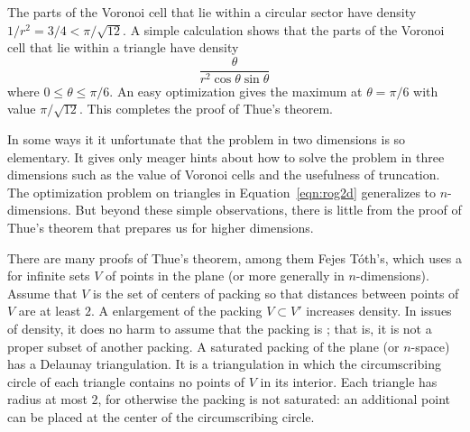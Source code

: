 The parts of the Voronoi cell that lie within a circular sector have
density $1/r^2 = 3/4 < \pi/\sqrt{12}$.  A simple calculation shows
that the parts of the Voronoi cell that lie within a triangle have
density
   \begin{equation}\label{eqn:rog2d}
   \frac{\theta}{r^2 \cos\theta\sin\theta}
   \end{equation}
where $0 \le \theta\le \pi/6$.  An easy optimization gives the maximum
at $\theta=\pi/6$ with value $\pi/\sqrt{12}$.  This completes the proof of Thue's theorem.

In some ways it it unfortunate that the problem in two dimensions is
so elementary.  It gives only meager hints about how to solve the problem
in three dimensions such as the value of Voronoi cells
and the usefulness of truncation.  The optimization problem on
triangles in Equation~\ref{eqn:rog2d} generalizes to $n$-dimensions.
But beyond these simple observations, there is little from the proof of Thue's
theorem that prepares us for higher dimensions.


\bigskip

There are many proofs of Thue's theorem, among them Fejes T\'oth's, which
uses  a  for infinite sets $V$ of points in the plane (or more
generally in $n$-dimensions).  Assume that $V$ is the set of centers
of packing so that distances between points of $V$ are at least $2$.
A enlargement of the packing $V\subset V'$ increases density.  In
issues of density, it does no harm to assume that the packing is
; that is, it is not a proper subset of another
packing.  A saturated packing of the plane (or $n$-space) has a
Delaunay triangulation.  It is a triangulation in which the
circumscribing circle of each triangle contains no points of $V$ in
its interior.  Each  triangle has radius at most $2$, for
otherwise the packing is not saturated: an additional point can be
placed at the center of the circumscribing circle.

